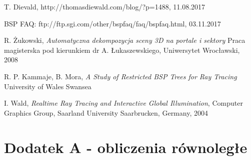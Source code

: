 \documentclass[12pt]{report}
\begin{document}
\begin{thebibliography}{9}
	T. Dievald, http://thomasdiewald.com/blog/?p=1488, 11.08.2017
	
	BSP FAQ: ftp://ftp.sgi.com/other/bspfaq/faq/bspfaq.html, 03.11.2017
	
	R. Żukowski,
	\emph{Automatyczna dekompozycja sceny 3D na portale i sektory}
	Praca magisterska pod kierunkiem dr A. Łukaszewskiego,
	Uniwersytet Wrocławski,
	2008
	
	R. P. Kammaje, B. Mora,
	\emph{A Study of Restricted BSP Trees for Ray Tracing}
	University of Wales Swansea
	
	I. Wald,
	\emph{Realtime Ray Tracing and Interactive Global Illumination},
	Computer Graphics Group, Saarland University Saarbrucken, Germany,
	2004
	
\end{thebibliography}

\listoffigures

\chapter{Dodatek A - obliczenia równoległe}
\end{document}
